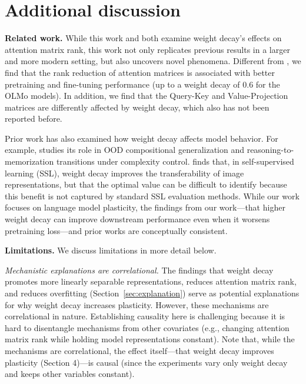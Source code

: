 \section{Additional discussion}
\label{app:additional-discussion}


\textbf{Related work.} 
While this work and \citet{kobayashi2024wdlowrank} both examine weight decay’s effects on attention matrix rank, this work not only replicates previous results in a larger and more modern setting, but also uncovers novel phenomena. Different from \citet{kobayashi2024wdlowrank}, we find that the rank reduction of attention matrices is associated with better pretraining and fine-tuning performance (up to a weight decay of 0.6 for the OLMo models). In addition, we find that the Query-Key and Value-Projection matrices are differently affected by weight decay, which also has not been reported before.


Prior work has also examined how weight decay affects model behavior. For example, \citet{zhang2025complexity} studies its role in OOD compositional generalization and reasoning-to-memorization transitions under complexity control. \citet{lee2023rethinking} finds that, in self-supervised learning (SSL), weight decay improves the transferability of image representations, but that the optimal value can be difficult to identify because this benefit is not captured by standard SSL evaluation methods. While our work focuses on language model plasticity, the findings from our work—that higher weight decay can improve downstream performance even when it worsens pretraining loss—and prior works are conceptually consistent.

\textbf{Limitations.}
We discuss limitations in more detail below.

\textit{Mechanistic explanations are correlational.} The findings that weight decay promotes more linearly separable representations, reduces attention matrix rank, and reduces overfitting (Section~\ref{sec:explanation}) serve as potential explanations for why weight decay increases plasticity. However, these mechanisms are correlational in nature. Establishing causality here is challenging because it is hard to disentangle mechanisms from other covariates (e.g., changing attention matrix rank while holding model representations constant). Note that, while the mechanisms are correlational, the effect itself—that weight decay improves plasticity (Section 4)—is causal (since the experiments vary only weight decay and keeps other variables constant).


